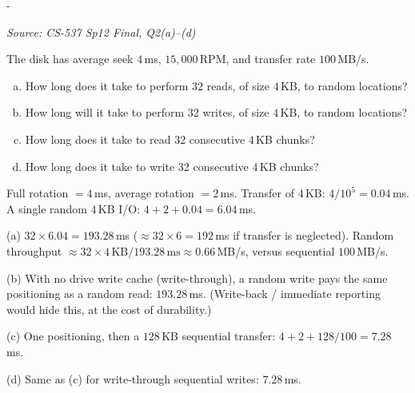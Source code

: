\documentclass[11pt,a4paper]{article}
\makeatletter
\newcommand{\keepspace}[1]{\par\penalty-100\begingroup
  \setlength{\dimen@}{#1}\dimen@ii\pagegoal\advance\dimen@ii-\pagetotal
  \ifdim\dimen@>\dimen@ii\ifdim\dimen@ii>\z@\vfil\fi\break\fi\endgroup}
\newcounter{qn}[section]
\newenvironment{Qn}[4]{%
  \refstepcounter{qn}\keepspace{7\baselineskip}%
  \begin{tcolorbox}[qboxstyle, title={Q\thesection.\theqn\ \ [#1 \textbar\ #2]\ \ #4}]%
  {\footnotesize\color{g3}\textit{Source: #3}}\par\smallskip%
}{%
  \end{tcolorbox}%
}
\newenvironment{Sol}{%
  \begin{tcolorbox}[sboxstyle, title={Solution}]%
}{%
  \end{tcolorbox}\vspace{0.35em}%
}
\makeatother
\begin{document}
\begin{Qn}{Medium-Hard}{Lect 22}{CS-537 Sp12 Final, Q2(a)--(d)}{32 random versus sequential 4\,KB I/Os on a 15k-RPM disk}
The disk has average seek $4$\,ms, $15{,}000$\,RPM, and transfer rate
$100$\,MB/s.
\begin{enumerate}[(a)]
\item How long does it take to perform 32 reads, of size $4$\,KB, to
      random locations?
\item How long will it take to perform 32 writes, of size $4$\,KB, to
      random locations?
\item How long does it take to read 32 consecutive $4$\,KB chunks?
\item How long does it take to write 32 consecutive $4$\,KB chunks?
\end{enumerate}
\end{Qn}
\begin{Sol}
Full rotation $= 4$\,ms, average rotation $= 2$\,ms.
Transfer of $4$\,KB: $4/10^{5} = 0.04$\,ms.
A single random $4$\,KB I/O: $4+2+0.04 = 6.04$\,ms.

(a) $32\times 6.04 = \mathbf{193.28}$\,ms
($\approx 32\times 6 = 192$\,ms if transfer is neglected).
Random throughput $\approx 32\times 4\,\mathrm{KB}/193.28\,\mathrm{ms}
\approx 0.66$\,MB/s, versus sequential $100$\,MB/s.

(b) With no drive write cache (write-through), a random write pays the
same positioning as a random read: $\mathbf{193.28}$\,ms.
(Write-back / immediate reporting would hide this, at the cost of
durability.)

(c) One positioning, then a $128$\,KB sequential transfer:
$4+2+128/100 = \mathbf{7.28}$\,ms.

(d) Same as (c) for write-through sequential writes:
$\mathbf{7.28}$\,ms.
\end{Sol}
\end{document}
